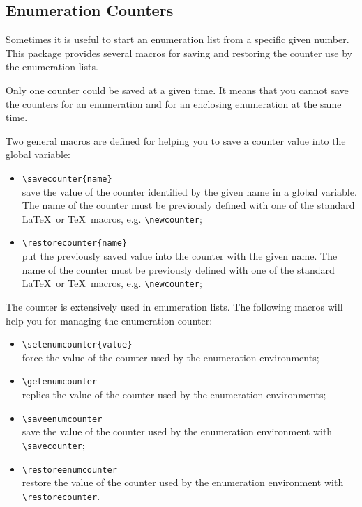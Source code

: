 \documentclass[book,taskpackage,specpackage,codepackage]{upmethodology-document}
\begin{document}
\subsection{Enumeration Counters}

Sometimes it is useful to start an enumeration list from a specific given number. This package provides several macros for saving and restoring the counter use by the enumeration lists.

\begin{upmcaution}
Only one counter could be saved at a given time.
It means that you cannot save the counters for an enumeration and for an enclosing enumeration at the same time.
\end{upmcaution}

Two general macros are defined for helping you to save a counter value into the global variable: 
\begin{itemize}
\item \texttt{{\textbackslash}savecounter\{name\}} \\
	save the value of the counter identified by the given name in a global variable.
	The name of the counter must be previously defined with one of the standard \LaTeX\ or \TeX\ macros, e.g. \texttt{{\textbackslash}newcounter};
\item \texttt{{\textbackslash}restorecounter\{name\}} \\
	put the previously saved value into the counter with the given name.
	The name of the counter must be previously defined with one of the standard \LaTeX\ or \TeX\ macros, e.g. \texttt{{\textbackslash}newcounter};
\end{itemize}

The counter is extensively used in enumeration lists. The following macros will help you for managing the enumeration counter:
\begin{itemize}
\item \texttt{{\textbackslash}setenumcounter\{value\}} \\
	force the value of the counter used by the enumeration environments;
\item \texttt{{\textbackslash}getenumcounter} \\
	replies the value of the counter used by the enumeration environments;
\item \texttt{{\textbackslash}saveenumcounter} \\
	save the value of the counter used by the enumeration environment with \texttt{{\textbackslash}savecounter};
\item \texttt{{\textbackslash}restoreenumcounter} \\
	restore the value of the counter used by the enumeration environment with \texttt{{\textbackslash}restorecounter}.
\end{itemize}
\end{document}
